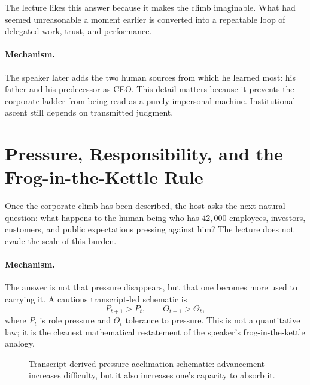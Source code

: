 The lecture likes this answer because it makes the climb imaginable. What had seemed unreasonable a moment earlier is converted into a repeatable loop of delegated work, trust, and performance.

\paragraph{Mechanism.} The speaker later adds the two human sources from which he learned most: his father and his predecessor as CEO. This detail matters because it prevents the corporate ladder from being read as a purely impersonal machine. Institutional ascent still depends on transmitted judgment.

\section{Pressure, Responsibility, and the Frog-in-the-Kettle Rule}

Once the corporate climb has been described, the host asks the next natural question: what happens to the human being who has \(42{,}000\) employees, investors, customers, and public expectations pressing against him? The lecture does not evade the scale of this burden.

\paragraph{Mechanism.} The answer is not that pressure disappears, but that one becomes more used to carrying it. A cautious transcript-led schematic is
\begin{equation}
P_{t+1}>P_t,\qquad \Theta_{t+1}>\Theta_t,
\end{equation}
where \(P_t\) is role pressure and \(\Theta_t\) tolerance to pressure. This is not a quantitative law; it is the cleanest mathematical restatement of the speaker's frog-in-the-kettle analogy.

\begin{figure}[h]
\centering
{}
\caption{Transcript-derived pressure-acclimation schematic: advancement increases difficulty, but it also increases one's capacity to absorb it.}
\end{figure}

